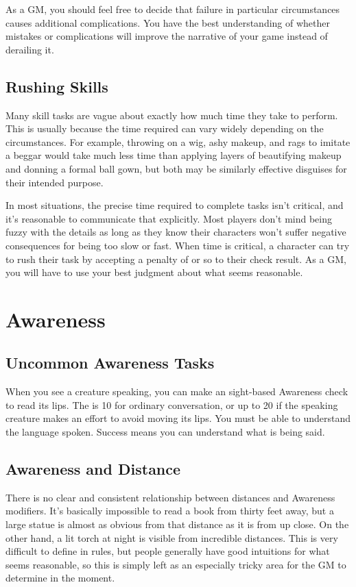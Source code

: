    As a GM, you should feel free to decide that failure in particular circumstances causes additional complications.
    You have the best understanding of whether mistakes or complications will improve the narrative of your game instead of derailing it.

  \subsection{Rushing Skills}
    Many skill tasks are vague about exactly how much time they take to perform.
    This is usually because the time required can vary widely depending on the circumstances.
    For example, throwing on a wig, ashy makeup, and rags to imitate a beggar would take much less time than applying layers of beautifying makeup and donning a formal ball gown, but both may be similarly effective disguises for their intended purpose.

    In most situations, the precise time required to complete tasks isn't critical, and it's reasonable to communicate that explicitly.
    Most players don't mind being fuzzy with the details as long as they know their characters won't suffer negative consequences for being too slow or fast.
    When time is critical, a character can try to rush their task by accepting a penalty of  or so to their check result.
    As a GM, you will have to use your best judgment about what seems reasonable.

\section{Awareness}

  \subsection{Uncommon Awareness Tasks}
     When you see a creature speaking, you can make an sight-based Awareness check to read its lips.
    The  is 10 for ordinary conversation, or up to 20 if the speaking creature makes an effort to avoid moving its lips.
    You must be able to understand the language spoken.
    Success means you can understand what is being said.

  \subsection{Awareness and Distance}
    There is no clear and consistent relationship between distances and Awareness modifiers.
    It's basically impossible to read a book from thirty feet away, but a large statue is almost as obvious from that distance as it is from up close.
    On the other hand, a lit torch at night is visible from incredible distances.
    This is very difficult to define in rules, but people generally have good intuitions for what seems reasonable, so this is simply left as an especially tricky area for the GM to determine in the moment.

